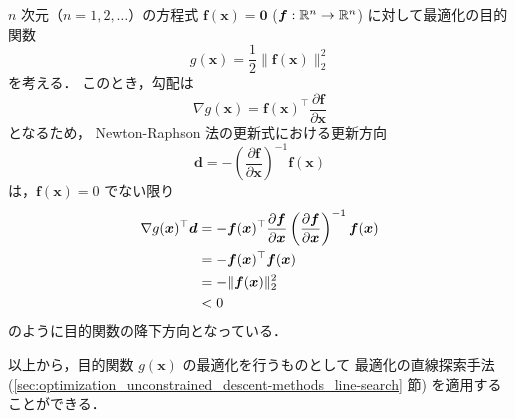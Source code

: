 $n$ 次元（$n=1,2,\ldots$）の方程式
$\bm{f}(\bm{x}) = \bm{0}$ ($\bm{f}: \mathbb{R}^n \to \mathbb{R}^n$)
に対して最適化の目的関数
\begin{equation}
    g(\bm{x}) = \frac{1}{2} \| \bm{f}(\bm{x}) \|_2^2
\end{equation}
を考える．
このとき，勾配は
\begin{equation}
    \nabla g(\bm{x}) = \bm{f}(\bm{x})^\top \frac{\partial \bm{f}}{\partial \bm{x}}
\end{equation}
となるため，
Newton-Raphson 法の更新式における更新方向
\begin{equation}
    \bm{d} = - \left(\frac{\partial \bm{f}}{\partial \bm{x}}\right)^{-1} \bm{f}(\bm{x})
\end{equation}
は，$\bm{f}(\bm{x}) = 0$ でない限り
\begin{align}
    \nabla g(\bm{x})^\top \bm{d}
     & = - \bm{f}(\bm{x})^\top \frac{\partial \bm{f}}{\partial \bm{x}}
    \left(\frac{\partial \bm{f}}{\partial \bm{x}}\right)^{-1} \bm{f}(\bm{x})
    \notag                                                             \\
     & = - \bm{f}(\bm{x})^\top \bm{f}(\bm{x})
    \notag                                                             \\
     & = - \| \bm{f}(\bm{x}) \|_2^2
    \notag                                                             \\
     & < 0
\end{align}
のように目的関数の降下方向となっている．

以上から，目的関数 $g(\bm{x})$ の最適化を行うものとして
最適化の直線探索手法
(\ref{sec:optimization_unconstrained_descent-methods_line-search} 節)
を適用することができる．
